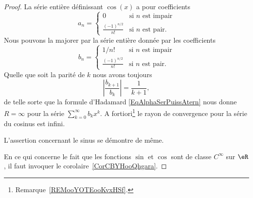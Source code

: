 \begin{proof}
	La série entière définissant \( \cos(x)\) a pour coefficients
	\begin{equation}
		a_n=\begin{cases}
			0                         & \text{si } n\text{ est impair} \\
			\frac{ (-1)^{n/2} }{ n! } & \text{si } n\text{ est pair}.
		\end{cases}
	\end{equation}
	Nous pouvons la majorer par la série entière donnée par les coefficients
	\begin{equation}
		b_n=\begin{cases}
			1/n!                      & \text{si } n\text{ est impair} \\
			\frac{ (-1)^{n/2} }{ n! } & \text{si } n\text{ est pair}.
		\end{cases}
	\end{equation}
	Quelle que soit la parité de \( k\) nous avons toujours
	\begin{equation}
		\left| \frac{ b_{k+1} }{ b_k } \right|=\frac{1}{ k+1 },
	\end{equation}
	de telle sorte que la formule d'Hadamard \eqref{EqAlphaSerPuissAtern} nous donne \( R=\infty\) pour la série \( \sum_{k=0}^{\infty}b_kx^k\). A fortiori\footnote{Remarque~\ref{REMooYOTEooKvxHSf}.} le rayon de convergence pour la série du cosinus est infini.

	L'assertion concernant le sinus se démontre de même.

	En ce qui concerne le fait que les fonctions \( \sin\) et \( \cos\) sont de classe \(  C^{\infty}\) sur \( \eR\), il faut invoquer le corolaire~\ref{CorCBYHooQhgara}.
\end{proof}


